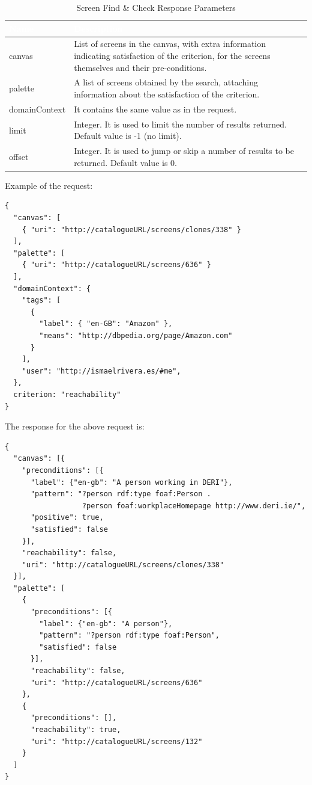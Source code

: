\documentclass{fast_latex}
\begin{document}
\begin{table}[htb!]
\caption{Screen Find \& Check Response Parameters}
\label{tab:screen_check_response}
\begin{center}
\begin{tabular}{|p{2.5cm}|p{11.5cm}|}
\hline
\rowcolor{fast@lightgrey}\textcolor{white}{Name} &
                         \textcolor{white}{Description}\\ \hline
canvas & List of screens in the canvas, with extra information indicating satisfaction of the criterion, for the screens themselves and their pre-conditions.\\ \hline
palette & A list of screens obtained by the search, attaching information about the satisfaction of the criterion.\\ \hline
domainContext & It contains the same value as in the request.\\ \hline
limit & Integer. It is used to limit the number of results returned. Default value is -1 (no limit).\\ \hline
offset & Integer. It is used to jump or skip a number of results to be returned. Default value is 0.\\ \hline
\end{tabular}
\end{center}
\end{table}

Example of the request:

\singlespacing
\begin{verbatim}
{
  "canvas": [
    { "uri": "http://catalogueURL/screens/clones/338" }
  ],
  "palette": [
    { "uri": "http://catalogueURL/screens/636" }
  ],
  "domainContext": {
    "tags": [
      {
        "label": { "en-GB": "Amazon" },
        "means": "http://dbpedia.org/page/Amazon.com"
      }
    ],
    "user": "http://ismaelrivera.es/#me",
  },
  criterion: "reachability"
}
\end{verbatim}
\doublespacing

The response for the above request is:

\singlespacing
\begin{verbatim}
{
  "canvas": [{
    "preconditions": [{
      "label": {"en-gb": "A person working in DERI"},
      "pattern": "?person rdf:type foaf:Person . 
                  ?person foaf:workplaceHomepage http://www.deri.ie/",
      "positive": true,
      "satisfied": false
    }],
    "reachability": false,
    "uri": "http://catalogueURL/screens/clones/338"
  }],
  "palette": [
    {
      "preconditions": [{
        "label": {"en-gb": "A person"},
        "pattern": "?person rdf:type foaf:Person",
        "satisfied": false
      }],
      "reachability": false,
      "uri": "http://catalogueURL/screens/636"
    },
    {
      "preconditions": [],
      "reachability": true,
      "uri": "http://catalogueURL/screens/132"
    }
  ]
}
\end{verbatim}
\doublespacing
\end{document}
